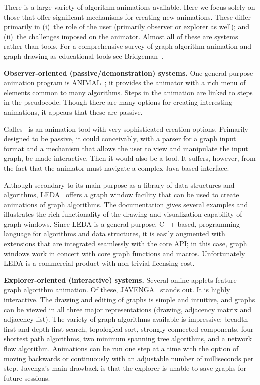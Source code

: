 There is a large variety of algorithm animations available. Here we focus solely on those that offer significant mechanisms for creating new animations.
These differ primarily in (i)~the role of the user (primarily observer
or explorer as well); and
(ii)~the challenges imposed on the animator.
Almost all of these are systems rather than tools.
For a comprehensive survey of graph algorithm animation and graph drawing
as educational tools see Bridgeman~\cite{2013-GDBook-Bridgeman}. 

\textbf{Observer-oriented (passive/demonstration) systems.}
One general purpose animation program is ANIMAL~\cite{2002-JVLC-Roessling,ANIMAL};
it provides the animator
with a rich menu
of elements common to many algorithms.
Steps in the animation are linked to steps in the pseudocode.
Though there are many options for creating interesting animations,
it appears that these are passive.

Galles~\cite{Galles} is an animation tool with very
sophisticated creation options.
Primarily designed to be passive, it could conceivably, with a parser
for a graph input format and a mechanism that allows the user to view and
manipulate the input graph, be made interactive.
Then it would also be a tool.
It suffers, however, from the fact that the
animator must navigate a complex Java-based interface.

Although secondary to its main purpose as a library of data structures and
algorithms,
LEDA~\cite{1999-LEDA-Mehlhorn} offers a graph window facility that can be
used to create animations of graph algorithms.
The documentation gives several examples and illustrates the rich functionality of
the drawing and visualization capability of graph windows.
Since LEDA is a general purpose, C++-based, programming language for
algorithms and data structures, it is easily augmented with extensions that
are integrated seamlessly with the core API; in this case, graph windows work
in concert with core graph functions and macros.
Unfortunately LEDA is a commercial product with
non-trivial licensing cost.

\textbf{Explorer-oriented (interactive) systems.}
Several online applets feature graph algorithm animation. Of these,
JAVENGA~\cite{JAVENGA,2012-CAEE-Baloukas} stands out. It is highly interactive. The drawing and
editing of
graphs is simple and intuitive, and graphs can be viewed in all three major
representations (drawing, adjacency matrix and adjacency list).
The variety of graph algorithms available is impressive:
breadth-first and depth-first search, topological sort, strongly connected
components, four shortest path algorithms, two minimum spanning tree
algorithms, and a network flow algorithm.
Animations can be run one step at a time with the option of moving backwards
or continuously with an adjustable number of milliseconds per step.
Javenga's main drawback is that the explorer is unable to save graphs for
future sessions.

